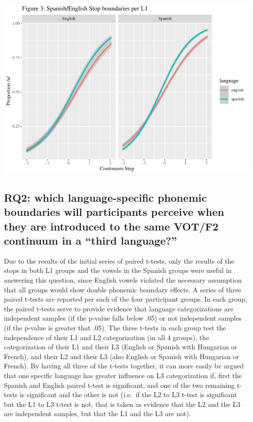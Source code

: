 \documentclass[
  english,
  man]{apa6}
\begin{document}
\includegraphics{master_files/figure-latex/unnamed-chunk-6-1.pdf}

\hypertarget{rq2-which-language-specific-phonemic-boundaries-will-participants-perceive-when-they-are-introduced-to-the-same-votf2-continuum-in-a-third-language}{%
\subsection{RQ2: which language-specific phonemic boundaries will participants perceive when they are introduced to the same VOT/F2 continuum in a ``third language?''}\label{rq2-which-language-specific-phonemic-boundaries-will-participants-perceive-when-they-are-introduced-to-the-same-votf2-continuum-in-a-third-language}}

Due to the results of the initial series of paired t-tests, only the results of the stops in both L1 groups and the vowels in the Spanish groups were useful in answering this question, since English vowels violated the necessary assumption that all groups would show double phonemic boundary effects. A series of three paired t-tests are reported per each of the four participant groups. In each group, the paired t-tests serve to provide evidence that language categorizations are independent samples (if the p-value falls below .05) or not independent samples (if the p-value is greater that .05).
The three t-tests in each group test the independence of their L1 and L2 categorization (in all 4 groups), the categorization of their L1 and their L3 (English or Spanish with Hungarian or French), and their L2 and their L3 (also English or Spanish with Hungarian or French). By having all three of the t-tests together, it can more easily be argued that one specific language has greater influence on L3 categorization if, first the Spanish and English paired t-test is significant, and one of the two remaining t-tests is significant and the other is not (i.e.~if the L2 to L3 t-test is significant but the L1 to L3 t-test is not, that is taken as evidence that the L2 and the L3 are independent samples, but that the L1 and the L3 are not).
\end{document}
